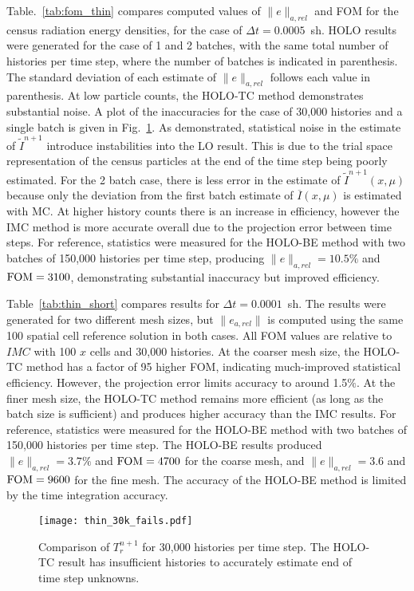Table.~\ref{tab:fom_thin} compares computed values of $\|e\|_{a,rel}$ and FOM for the census
radiation energy densities, for the case of $\Delta t =0.0005$~sh.   HOLO results were generated for the case of 1 and 2 batches, with the same
total number of histories per time step, where the number of batches is indicated in
parenthesis. The standard deviation of each estimate of $\|e\|_{a,rel}$ follows each value in parenthesis. 
At low particle counts, the HOLO-TC method demonstrates substantial noise.   
A plot
of the inaccuracies for the case of 30,000 histories and a single batch is given in
Fig.~\ref{fig:30k_fails}.  As demonstrated, statistical noise in the estimate of
$\tilde I^{n+1}$ introduce instabilities into the LO result.
This is due to the trial space representation of the
census particles at the end of the time step being poorly estimated.  For the 2 batch
case, there is less error in the estimate of $\tilde I^{n+1}(x,\mu)$ because only the
deviation from the first batch estimate of $\overline I(x,\mu)$ is estimated with MC. 
At higher history counts there is an increase in efficiency, however the IMC method is
more accurate overall due to the projection error between time steps.  For reference, statistics were measured for the HOLO-BE method with two batches of 150,000
histories per time step, producing $\|e\|_{a,rel}=10.5\%$ and $\text{FOM}=3100$, demonstrating
substantial inaccuracy but improved efficiency.

Table~\ref{tab:thin_short} compares results for $\Delta t = 0.0001$~sh.  The results were
generated for two different mesh sizes, but $\|e_{a,rel}\|$ is computed using the same 100
spatial cell reference solution in both cases.  All FOM values are relative to $IMC$ with
100 $x$ cells and 30,000 histories.  At the coarser mesh size, the HOLO-TC method has a
factor of 95 higher FOM, indicating much-improved statistical efficiency.  However, the projection error
limits accuracy to around 1.5$\%$.  At the finer mesh size, the
HOLO-TC method remains more efficient (as long as the batch size is sufficient) and produces higher accuracy than the IMC results.
For reference, statistics were measured for the HOLO-BE method with two batches of 150,000
histories per time step. The HOLO-BE results produced $\|e\|_{a,rel}=3.7\%$ and $\text{FOM}=4700$ for the
coarse mesh, and $\|e\|_{a,rel}=3.6$ and $\text{FOM}=9600$ for the fine mesh.  The accuracy of the HOLO-BE method
is limited by the time integration accuracy.
\begin{figure}
    \centering
    \texttt{[image: thin\_30k\_fails.pdf]}
    \caption{\label{fig:30k_fails}Comparison of $T_{r}^{n+1}$ for 30,000 histories per time step.  The HOLO-TC result has insufficient
histories to accurately estimate end of time step unknowns.}
\end{figure}

